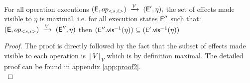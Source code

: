 %
%
\begin{theorem}
\label{theorem:two}
For all operation executions 
$({\normalfont \textsf{E}},op_{<s,i>}) 
    \;\xrightarrow{V}\;
  ({\normalfont \textsf{E}}',\eta) 
,$
the set of effects made visible to $\eta$ is maximal. i.e. for all
execution states ${\normalfont \textsf{E}}''$ such that:
$({\normalfont \textsf{E}},op_{<s,i>})\;\xrightarrow{V}\;({\normalfont \textsf{E}}'',\eta)$
then    
$\small ({\normalfont \textsf{E}}''.{\normalfont \textsf{vis}}^{-1}(\eta)) \subseteq
({\normalfont \textsf{E}}'.{\normalfont \textsf{vis}}^{-1}(\eta))$
\end{theorem}
\begin{proof}
The proof is directly followed by the fact that the subset of effects
made visible to each operation is  $\left \lfloor V
\right \rfloor_V$ which is by definition maximal. The detailed proof can be found in appendix
\ref{app:proof2}. \\
\end{proof}



